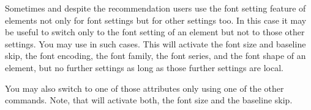 \begin{Declaration}
  \\
  \\
  \\
  \\
  \\
\end{Declaration}
%
%
%
%
%
%
Sometimes and despite the recommendation
users use the font setting feature of elements not only for font settings but
for other settings too. In this case it may be useful to switch only to the
font setting of an element but not to those other settings. You may use
 in such cases. This will activate the font size and
baseline skip, the font encoding, the font family, the font series, and the
font shape of an element, but no further settings as long as those further
settings are local.

You may also switch to one of those attributes only using one of the other
commands. Note, that  will activate both, the font
size and the baseline skip.%
%
%
%
%
%
%
%
%
\fi %

